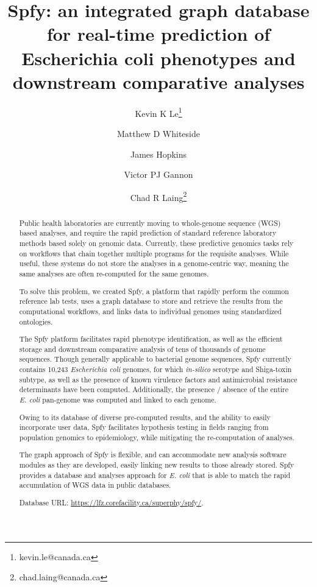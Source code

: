 \documentclass{article}
\begin{document}
\title{Spfy: an integrated graph database for real-time prediction of Escherichia coli phenotypes and downstream comparative analyses}

\author[1]{Kevin K Le\thanks{kevin.le@canada.ca}}
\author[1]{Matthew D Whiteside}
\author[1]{James Hopkins}
\author[1]{Victor PJ Gannon}
\author[1]{Chad R Laing\thanks{chad.laing@canada.ca}}

\renewcommand\Authands{ and }

\maketitle

\begin{abstract}

Public health laboratories are currently moving to whole-genome sequence (WGS) based analyses, and require the rapid prediction of standard reference laboratory methods based solely on genomic data. Currently, these predictive genomics tasks rely on workflows that chain together multiple programs for the requisite analyses. While useful, these systems do not store the analyses in a genome-centric way, meaning the same analyses are often re-computed for the same genomes.

To solve this problem, we created Spfy, a platform that rapidly perform the common reference lab tests, uses a graph database to store and retrieve the results from the computational workflows, and links data to individual genomes using standardized ontologies.

The Spfy platform facilitates rapid phenotype identification, as well as the efficient storage and downstream comparative analysis of tens of thousands of genome sequences. Though generally applicable to bacterial genome sequences, Spfy currently contains 10,243 \textit{Escherichia coli} genomes, for which \textit{in-silico} serotype and Shiga-toxin subtype, as well as the presence of known virulence factors and antimicrobial resistance determinants have been computed. Additionally, the presence / absence of the entire \textit{E. coli} pan-genome was computed and linked to each genome.

Owing to its database of diverse pre-computed results, and the ability to easily incorporate user data, Spfy facilitates hypothesis testing in fields ranging from population genomics to epidemiology, while mitigating the re-computation of analyses.

The graph approach of Spfy is flexible, and can accommodate new analysis software modules as they are developed, easily linking new results to those already stored. Spfy provides a database and analyses approach for \textit{E. coli} that is able to match the rapid accumulation of WGS data in public databases.
\par

Database URL: \url{https://lfz.corefacility.ca/superphy/spfy/}.

\end{abstract}
\end{document}
